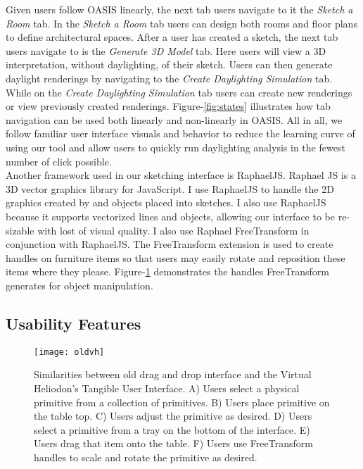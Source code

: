 		Given users follow OASIS linearly, the next tab users navigate to it the \textit{Sketch a Room} tab. In the \textit{Sketch a Room} tab users can design both rooms and floor plans to define architectural spaces.
		After a user has created a sketch, the next tab users navigate to is the \textit{Generate 3D Model} tab. 
		Here users will view a 3D interpretation, without daylighting, of their sketch. 
		Users can then generate daylight renderings by navigating to the \textit{Create Daylighting Simulation} tab.
		While on the \textit{Create Daylighting Simulation} tab users can create new renderings or view previously created renderings.
		Figure-\ref{fig:states} illustrates how tab navigation can be used both linearly and non-linearly in OASIS.
		All in all, we follow familiar user interface visuals and behavior to reduce the learning curve of using our tool and allow users to quickly run daylighting analysis in the fewest number of click possible.\\


		Another framework used in our sketching interface is RaphaelJS\cite{}.
		Raphael JS is a 3D vector graphics library for JavaScript. 
		I use RaphaelJS to handle the 2D graphics created by and objects placed into sketches. I also use RaphaelJS because it supports vectorized lines and objects, allowing our interface  to be re-sizable with lost of visual quality.
		I also use Raphael FreeTransform in conjunction with RaphaelJS\cite{}. 
		The FreeTransform extension is used to create handles on furniture items so that users may easily rotate and reposition these items where they please.
		Figure-\ref{fig:oldvh} demonstrates the handles FreeTransform generates for object manipulation.\\

	\subsection{Usability Features}

		\begin{figure}[t]
		\centering
		\texttt{[image: oldvh]}
		\caption{Similarities between old drag and drop interface and the Virtual Heliodon's Tangible User Interface. A) Users select a physical primitive from a collection of primitives. B) Users place primitive on the table top. C) Users adjust the primitive as desired. D) Users select a primitive from a tray on the bottom of the interface. E) Users drag that item onto the table. F) Users use FreeTransform handles to scale and rotate the primitive as desired.}
		\label{fig:oldvh}
		\end{figure}

